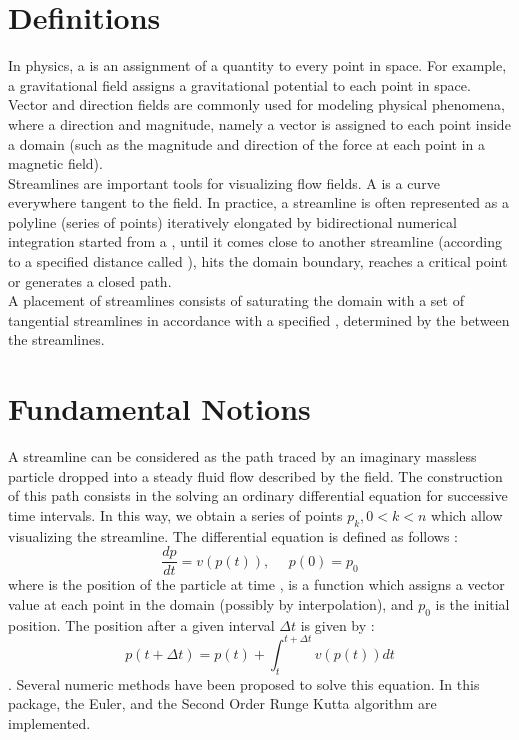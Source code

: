 \section{Definitions}
\label{Section_2D_Streamlines_Definitions}

In physics, a  is an assignment of a quantity to every
point in space. For example, a gravitational field assigns a
gravitational potential to each point in space.\\

Vector and direction fields are commonly used for modeling physical
phenomena, where a direction and magnitude, namely a vector is assigned to
each point inside a domain (such as the magnitude and direction of the
force at each point in a magnetic field).\\

Streamlines are important tools for visualizing flow fields. A
 is a curve everywhere tangent to the field. In practice, 
a streamline is often represented as a polyline (series of points)
iteratively elongated by bidirectional numerical integration started
from a , until it comes close to another streamline
(according to a specified distance called ), hits the domain boundary, reaches a critical point or
generates a closed path.\\

A  placement of streamlines consists of saturating the
domain with a set of tangential streamlines in accordance with a
specified , determined by the 
between the streamlines.

\section{Fundamental Notions}
\label{Section_2D_Streamlines_Fundamental_notions}

A streamline can be considered as the path traced by an imaginary
massless particle dropped into a steady fluid flow described by the
field. The construction of this path consists in the solving an
ordinary differential equation for successive time intervals. In this
way, we obtain a series of points $p_k, 0<k<n$ which allow visualizing
the streamline. The differential equation is defined as follows :
$$\frac{dp}{dt} = v(p(t)), \ \ \ \ \ \ p(0) = p_0$$ where  is the
position of the particle at time ,  is a function which
assigns a vector value at each point in the domain (possibly by
interpolation), and $p_0$ is the initial position.  The position after
a given interval $\Delta t$ is given by : $$p(t + \Delta t) = p(t) +
\int_t^{t+\Delta t} v(p(t)) dt$$. Several numeric methods have been
proposed to solve this equation. In this package, the Euler, and the
Second Order Runge Kutta algorithm are implemented.

